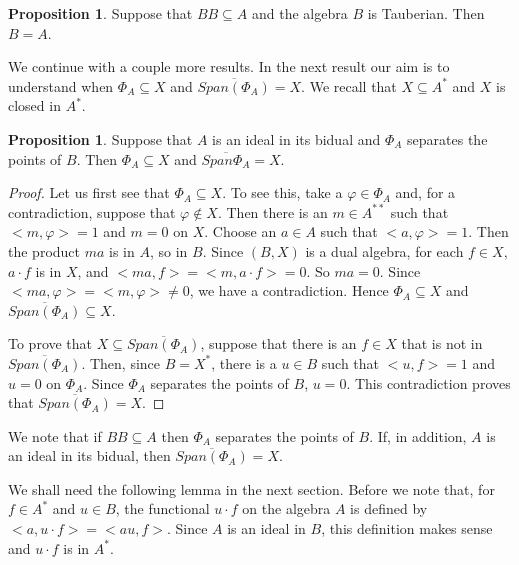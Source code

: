 \documentclass[12pt, twoside, leqno]{article}
\theoremstyle{definition}
\newtheorem{proposition}[theorem]{Proposition}
\theoremstyle{definition}
\numberwithin{equation}{section}
\begin{document}
\begin{proposition} Suppose that $ BB\subseteq A $ and the algebra $ B $ is Tauberian. Then $ B=A $. 	
\end{proposition}
We continue with a couple more results. In the next result our aim is to understand when $ \Phi_{A}\subseteq X $ and $ \overline{Span(\Phi_{A})}=X $. We recall that $ X\subseteq A^{*} $ and $ X $ is closed in $ A^{*} $.

\begin{proposition}
	Suppose that $ A $ is an ideal in its bidual and $ \Phi_{A} $ separates the points of $ B $. Then $ \Phi_{A}\subseteq X $ and $ \overline{Span\Phi_{A}}=X $.
\end{proposition}
\begin{proof}
	Let us first see that $ \Phi_{A}\subseteq X $. To see this, take a $ \varphi\in \Phi_{A} $ and, for a contradiction, suppose that $ \varphi\notin X $. Then there is an $ m\in A^{**} $ such that $ <m,\varphi>=1 $ and $ m=0 $ on $ X $. Choose an $ a\in A $ such that $ <a,\varphi>=1 $. Then the product $ ma$ is in $A $, so in $ B $. Since $ (B,X) $ is a dual algebra, for each $ f\in X $, $a\cdot f$ is in $X$, and $ <ma,f>=<m,a\cdot f>=0 $. So $ ma=0 $. Since $ <ma,\varphi>=<m,\varphi>\ne 0 $, we have a contradiction. Hence $ \Phi_{A}\subseteq X $ and $ \overline{Span(\Phi_{A})}\subseteq X $.\vspace{2mm}
	
	To prove that $ X\subseteq \overline{Span(\Phi_{A})} $, suppose that there is an $ f\in X $ that is not in $ \overline{Span(\Phi_{A})} $. Then, since $ B=X^{*} $, there is a $ u\in B $ such that $ <u,f>=1 $ and $ u=0 $ on $ \Phi_{A} $. Since $ \Phi_{A} $ separates the points of $ B $, $ u=0 $. This contradiction proves that $ \overline{Span(\Phi_{A})}=X $. 
\end{proof}
We note that if $ BB\subseteq A $ then $ \Phi_{A} $ separates the points of $ B $. If, in addition, $ A $ is an ideal in its bidual, then $\overline{Span(\Phi_{A})}=X $.\vspace{2mm}

 We shall need the following lemma in the next section. Before  we note that, for $ f\in A^{*} $ and $ u\in B $, the functional  $ u\cdot f $ on the algebra $ A $ is defined by $ <a,u\cdot f>=<au,f> $. Since $ A $ is an ideal in $ B $, this definition makes sense and $ u\cdot f $ is in $ A^{*} $.
 
\end{document}

